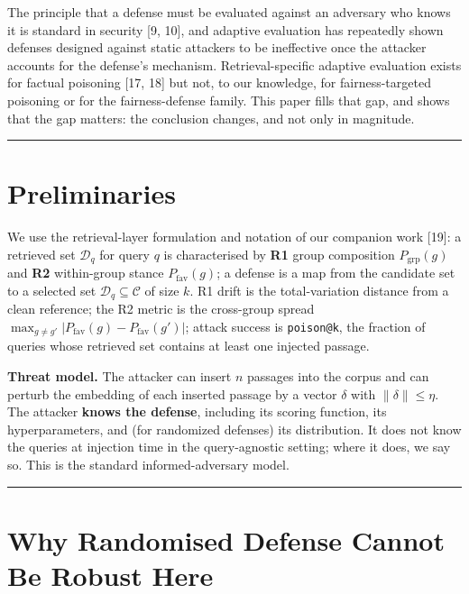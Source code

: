 \documentclass[review,3p,times]{elsarticle}
\begin{document}
The principle that a defense must be evaluated against an adversary who knows it is standard in security {[}9, 10{]}, and adaptive evaluation has repeatedly shown defenses designed against static attackers to be ineffective once the attacker accounts for the defense's mechanism. Retrieval-specific adaptive evaluation exists for factual poisoning {[}17, 18{]} but not, to our knowledge, for fairness-targeted poisoning or for the fairness-defense family. This paper fills that gap, and shows that the gap matters: the conclusion changes, and not only in magnitude.

\begin{center}\rule{0.5\linewidth}{0.5pt}\end{center}

\section{Preliminaries}\label{preliminaries}

We use the retrieval-layer formulation and notation of our companion work {[}19{]}: a retrieved set \(\mathcal{D}_q\) for query \(q\) is characterised by \textbf{R1} group composition \(P_{\text{grp}}(g)\) and \textbf{R2} within-group stance \(P_{\text{fav}}(g)\); a defense is a map from the candidate set to a selected set \(\mathcal{D}_q \subseteq \mathcal{C}\) of size \(k\). R1 drift is the total-variation distance from a clean reference; the R2 metric is the cross-group spread \(\max_{g \neq g'}|P_{\text{fav}}(g) - P_{\text{fav}}(g')|\); attack success is \texttt{poison@k}, the fraction of queries whose retrieved set contains at least one injected passage.

\textbf{Threat model.} The attacker can insert \(n\) passages into the corpus and can perturb the embedding of each inserted passage by a vector \(\delta\) with \(\|\delta\| \le \eta\). The attacker \textbf{knows the defense}, including its scoring function, its hyperparameters, and (for randomized defenses) its distribution. It does not know the queries at injection time in the query-agnostic setting; where it does, we say so. This is the standard informed-adversary model.

\begin{center}\rule{0.5\linewidth}{0.5pt}\end{center}

\section{Why Randomised Defense Cannot Be Robust Here}\label{why-randomised-defense-cannot-be-robust-here}
\end{document}
